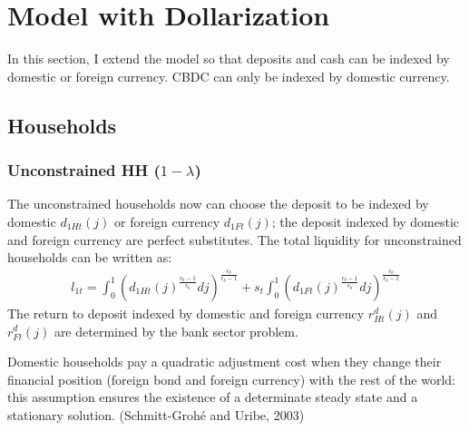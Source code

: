 \documentclass[12pt]{article}
\begin{document}
\section{Model with Dollarization}
In this section, I extend the model so that deposits and cash can be indexed by domestic or foreign currency. CBDC can only be indexed by domestic currency. 
\subsection{Households}
\subsubsection*{Unconstrained HH ($1-\lambda$)} 
The unconstrained households now can choose the deposit to be indexed by domestic $d_{1Ht}(j)$ or foreign currency $d_{1Ft}(j)$; the deposit indexed by domestic and foreign currency are perfect substitutes. The total liquidity for unconstrained households can be written as: 
\begin{align*}
l_{1t} = \int_0^1({d_{1Ht}(j)}^{\frac{\epsilon_b-1}{\epsilon_b}}dj)^{\frac{\epsilon_b}{\epsilon_b-1}}+s_t\int_0^1({d_{1Ft}(j)}^{\frac{\epsilon_b-1}{\epsilon_b}}dj)^{\frac{\epsilon_b}{\epsilon_b-1}} 
\end{align*}
The return to deposit indexed by domestic and foreign currency $r_{Ht}^d(j)$ and $r_{Ft}^d(j)$ are determined by the bank sector problem. 

Domestic households pay a quadratic adjustment cost when they change their financial position (foreign bond and foreign currency) with the rest of the world: this assumption ensures the existence of a determinate steady state and a stationary solution. (Schmitt-Groh{\'e} and Uribe, 2003)
\end{document}
